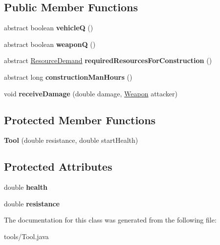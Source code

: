 \subsection*{Public Member Functions}
\begin{DoxyCompactItemize}
\item 
abstract boolean {\bfseries vehicleQ} ()\hypertarget{classtools_1_1_tool_a7c75a753d0de1d17801367c56d0dbfcd}{}\label{classtools_1_1_tool_a7c75a753d0de1d17801367c56d0dbfcd}

\item 
abstract boolean {\bfseries weaponQ} ()\hypertarget{classtools_1_1_tool_a0c5b08b98e1577d58eb3d1d1a867ad21}{}\label{classtools_1_1_tool_a0c5b08b98e1577d58eb3d1d1a867ad21}

\item 
abstract \hyperlink{classuniverse_1_1_resource_demand}{Resource\+Demand} {\bfseries required\+Resources\+For\+Construction} ()\hypertarget{classtools_1_1_tool_a886fb5e272c7b471b91df8a3dbcad61c}{}\label{classtools_1_1_tool_a886fb5e272c7b471b91df8a3dbcad61c}

\item 
abstract long {\bfseries construction\+Man\+Hours} ()\hypertarget{classtools_1_1_tool_aafd4b1569d51e92ae3c591f119f40690}{}\label{classtools_1_1_tool_aafd4b1569d51e92ae3c591f119f40690}

\item 
void {\bfseries receive\+Damage} (double damage, \hyperlink{classtools_1_1weapons_1_1_weapon}{Weapon} attacker)\hypertarget{classtools_1_1_tool_a1164a5de83073c8b213a536196502619}{}\label{classtools_1_1_tool_a1164a5de83073c8b213a536196502619}

\end{DoxyCompactItemize}
\subsection*{Protected Member Functions}
\begin{DoxyCompactItemize}
\item 
{\bfseries Tool} (double resistance, double start\+Health)\hypertarget{classtools_1_1_tool_ae747335e706e80c513b7bc5489722a0f}{}\label{classtools_1_1_tool_ae747335e706e80c513b7bc5489722a0f}

\end{DoxyCompactItemize}
\subsection*{Protected Attributes}
\begin{DoxyCompactItemize}
\item 
double {\bfseries health}\hypertarget{classtools_1_1_tool_a00aa447eca5d018bba15ed7b81ce72e4}{}\label{classtools_1_1_tool_a00aa447eca5d018bba15ed7b81ce72e4}

\item 
double {\bfseries resistance}\hypertarget{classtools_1_1_tool_a6c8f8c76616b8498fd1b62d5f602c88a}{}\label{classtools_1_1_tool_a6c8f8c76616b8498fd1b62d5f602c88a}

\end{DoxyCompactItemize}


The documentation for this class was generated from the following file\+:\begin{DoxyCompactItemize}
\item 
tools/Tool.\+java\end{DoxyCompactItemize}
